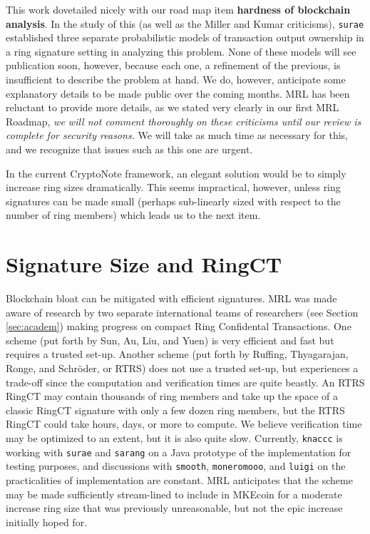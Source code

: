 \documentclass[12pt,english]{mrl}
\theoremstyle{definition}
\numberwithin{equation}{section}
\numberwithin{figure}{section}
\numberwithin{equation}{section}
\numberwithin{equation}{section}
\numberwithin{figure}{section}
\begin{document}
This work dovetailed nicely with our road map item \textbf{hardness of blockchain analysis}.  In the study of this (as well as the Miller and Kumar criticisms), \texttt{surae} established three separate probabilistic models of transaction output ownership in a ring signature setting in analyzing this problem. None of these models will see publication soon, however, because each one, a refinement of the previous, is insufficient to describe the problem at hand. We do, however, anticipate some explanatory details to be made public over the coming months. MRL has been reluctant to provide more details, as we stated very clearly in our first MRL Roadmap, \emph{we will not comment thoroughly on these criticisms until our review is complete for security reasons.} We will take as much time as necessary for this, and we recognize that issues such as this one are urgent.
    
In the current CryptoNote framework, an elegant solution would be to simply increase ring sizes dramatically. This seems impractical, however, unless ring signatures can be made small (perhaps sub-linearly sized with respect to the number of ring members) which leads us to the next item.
    
\section{Signature Size and RingCT}

Blockchain bloat can be mitigated with efficient signatures. MRL was made aware of research by two separate international teams of researchers (see Section \ref{sec:academ}) making progress on compact Ring Confidental Transactions. One scheme (put forth by Sun, Au, Liu, and Yuen) is very efficient and fast but requires a trusted set-up. Another scheme (put forth by Ruffing,  Thyagarajan, Ronge, and Schr{\"o}der, or RTRS) does not use a trusted set-up, but experiences a trade-off since the computation and verification times are quite beastly. An RTRS RingCT may contain thousands of ring members and take up the space of a classic RingCT signature with only a few dozen ring members, but the RTRS RingCT could take hours, days, or more to compute. We believe verification time may be optimized to an extent, but it is also quite slow. Currently, \texttt{knaccc} is working with \texttt{surae} and \texttt{sarang} on a Java prototype of the implementation for testing purposes, and discussions with \texttt{smooth}, \texttt{moneromooo}, and \texttt{luigi} on the practicalities of implementation are constant. MRL anticipates that the scheme may be made sufficiently stream-lined to include in MKEcoin for a moderate increase ring size that was previously unreasonable, but not the epic increase initially hoped for.
    
\end{document}
